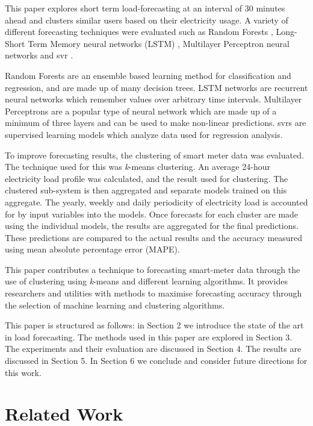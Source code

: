 This paper explores short term load-forecasting at an interval of 30 minutes ahead and clusters similar users based on their electricity usage. A variety of different forecasting techniques were evaluated such as Random Forests \cite{TinKamHo}, Long-Short Term Memory neural networks (LSTM) \cite{lstm}, Multilayer Perceptron neural networks \cite{book:984557} and \acrfull{svr} \cite{Drucker1997}.

Random Forests are an ensemble based learning method for classification and regression, and are made up of many decision trees. LSTM networks are recurrent neural networks which remember values over arbitrary time intervals. Multilayer Perceptrons are a popular type of neural network which are made up of a minimum of three layers and can be used to make non-linear predictions. \acrshort{svr}s are supervised learning models which analyze data used for regression analysis.

To improve forecasting results, the clustering of smart meter data was evaluated. The technique used for this was \textit{k}-means clustering. An average 24-hour electricity load profile was calculated, and the result used for clustering. The clustered sub-system is then aggregated and separate models trained on this aggregate. The yearly, weekly and daily periodicity of electricity load is accounted for by input variables into the models. Once forecasts for each cluster are made using the individual models, the results are aggregated for the final predictions. These predictions are compared to the actual results and the accuracy measured using mean absolute percentage error (MAPE).

This paper contributes a technique to forecasting smart-meter data through the use of clustering using \textit{k}-means and different learning algorithms. It provides researchers and utilities with methods to maximise forecasting accuracy through the selection of machine learning and clustering algorithms.

This paper is structured as follows: in Section 2 we introduce the state of the art in load forecasting. The methods used in this paper are explored in Section 3. The experiments and their evaluation are discussed in Section 4. The results are discussed in Section 5. In Section 6 we conclude and consider future directions for this work.

\section{Related Work}

